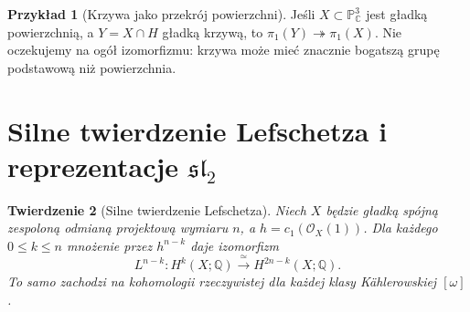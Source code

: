 \documentclass[11pt,a4paper,oneside]{report}
\newcommand{\C}{\mathbb{C}}
\newcommand{\Q}{\mathbb{Q}}
\theoremstyle{plain}
\newtheorem{twierdzenie}{Twierdzenie}[section]
\theoremstyle{definition}
\newtheorem{przyklad}[twierdzenie]{Przykład}
\theoremstyle{remark}
\begin{document}
\begin{przyklad}[Krzywa jako przekrój powierzchni]
Jeśli $X\subset\mathbb P^3_\C$ jest gładką powierzchnią,
a $Y=X\cap H$ gładką krzywą, to $\pi_1(Y)\twoheadrightarrow\pi_1(X)$.
Nie oczekujemy na ogół izomorfizmu: krzywa może mieć
znacznie bogatszą grupę podstawową niż powierzchnia.
\end{przyklad}

\section{Silne twierdzenie Lefschetza i reprezentacje $\mathfrak{sl}_2$}
\begin{twierdzenie}[Silne twierdzenie Lefschetza]
\label{thm:xvii-hard-lefschetz}
Niech $X$ będzie gładką spójną zespoloną odmianą projektową
wymiaru $n$, a $h=c_1(\mathcal O_X(1))$.
Dla każdego $0\le k\le n$ mnożenie przez $h^{n-k}$ daje izomorfizm
\[
L^{n-k}:H^k(X;\Q)\xrightarrow{\ \simeq\ }H^{2n-k}(X;\Q).
\]
To samo zachodzi na kohomologii rzeczywistej dla każdej
klasy Kählerowskiej $[\omega]$.
\end{twierdzenie}
\end{document}
